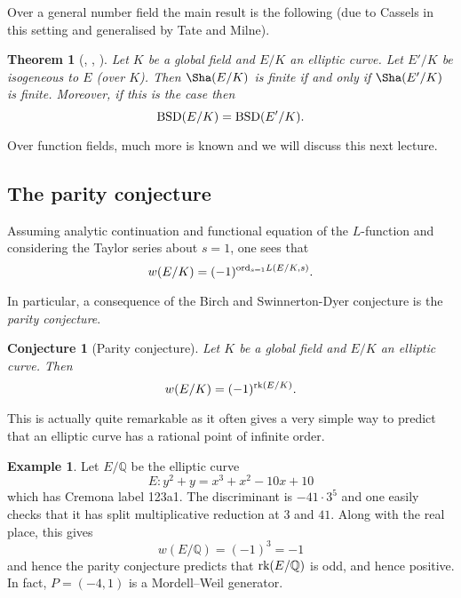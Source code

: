 \documentclass[12pt]{amsart}
\numberwithin{equation}{section}
\newtheorem{theorem}[equation]{Theorem}
\newtheorem{conjecture}{Conjecture}
\theoremstyle{remark}
\theoremstyle{definition}
\newtheorem{example}[equation]{Example}
\theoremstyle{definition}
\theoremstyle{definition}
\theoremstyle{definition}
\theoremstyle{definition}
\theoremstyle{definition}
\theoremstyle{definition}
\begin{document}
Over a general number field the main result is the following (due to Cassels in this setting and generalised by Tate and Milne).
 
 \begin{theorem}[{\cite{MR0179169}, \cite{MR1610977}, \cite[Theorem 7.3 and Remark 7.4]{MR2261462}}]
 Let $K$ be a global field and $E/K$ an elliptic curve. Let $E'/K$ be isogeneous to $E$ (over $K$). Then $\Sha(E/K)$ is finite if and only if $\Sha(E'/K)$ is finite. Moreover, if this is the case then
 \[\textup{BSD}(E/K)=\textup{BSD}(E'/K).\] 
 \end{theorem}
 
 Over function fields, much more is known and we will discuss this next lecture.

%

\subsection{The parity conjecture}

Assuming analytic continuation and functional equation of the $L$-function and considering the Taylor series about $s=1$, one sees that
\[w(E/K)=(-1)^{\textup{ord}_{s=1}L(E/K,s)}.\]

In particular, a consequence of the Birch and Swinnerton-Dyer conjecture is the \textit{parity conjecture}.

\begin{conjecture}[Parity conjecture]
Let $K$ be a global field and $E/K$ an elliptic curve. Then 
\[w(E/K)=(-1)^{\textup{rk}(E/K)}.\]
\end{conjecture}

This is actually quite remarkable as it often gives a very simple way to predict that an elliptic curve has a rational point of infinite order. 

\begin{example}
Let $E/\mathbb{Q}$ be the elliptic curve 
\[E:y^2+y=x^3+x^2-10x+10\]
which has Cremona label 123a1. The discriminant is $-41\cdot3^5$ and one easily checks that it has split multiplicative reduction at $3$ and $41$. Along with the real place, this gives
\[w(E/\mathbb{Q})=(-1)^3=-1\]
and hence the parity conjecture predicts that $\textup{rk}(E/\mathbb{Q})$ is odd, and hence positive. In fact, $P=(-4,1)$ is a Mordell--Weil generator.
\end{example}
\end{document}
